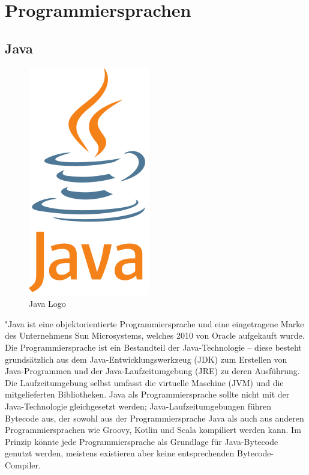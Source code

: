 \section{Programmiersprachen}

\subsection{Java}

\begin{figure}
    \centering
    \includegraphics[scale=0.5]{pics/java.png}
    \caption{Java Logo\cite{java}}
    \label{fig:impl:java}
\end{figure}

"Java ist eine objektorientierte Programmiersprache und eine eingetragene Marke des Unternehmens Sun Microsystems, welches 2010 von Oracle aufgekauft wurde. Die Programmiersprache ist ein Bestandteil der Java-Technologie – diese besteht grundsätzlich aus dem Java-Entwicklungswerkzeug (JDK) zum Erstellen von Java-Programmen und der Java-Laufzeitumgebung (JRE) zu deren Ausführung. Die Laufzeitumgebung selbst umfasst die virtuelle Maschine (JVM) und die mitgelieferten Bibliotheken. Java als Programmiersprache sollte nicht mit der Java-Technologie gleichgesetzt werden; Java-Laufzeitumgebungen führen Bytecode aus, der sowohl aus der Programmiersprache Java als auch aus anderen Programmiersprachen wie Groovy, Kotlin und Scala kompiliert werden kann. Im Prinzip könnte jede Programmiersprache als Grundlage für Java-Bytecode genutzt werden, meistens existieren aber keine entsprechenden Bytecode-Compiler.


